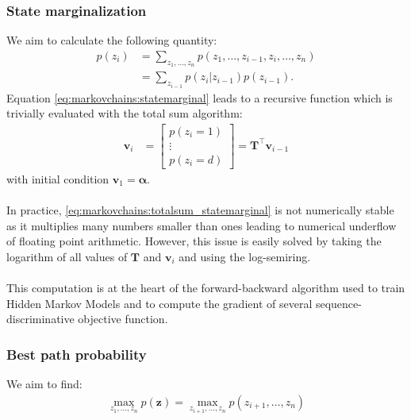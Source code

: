 \subsubsection{State marginalization}
We aim to calculate the following
quantity:
\begin{align}
    p(z_i) &= \sum_{z_1, \dots, z_{n}} p(z_1, \dots, z_{i-1}, z_i, \dots, z_n) \\
    &= \sum_{z_{i-1}} p(z_i | z_{i-1}) p(z_{i-1}).
    \label{eq:markovchains:statemarginal}
\end{align}
Equation \ref{eq:markovchains:statemarginal} leads to a recursive
function which is trivially evaluated with the total sum algorithm:
\begin{align}
    \mathbf{v}_i &= \begin{bmatrix}
        p(z_i = 1) \\
        \vdots \\
        p(z_i = d)
    \end{bmatrix} = \mathbf{T}^\top \mathbf{v}_{i-1}
    \label{eq:markovchains:totalsum_statemarginal}
\end{align}
with initial condition $\mathbf{v}_1 = \boldsymbol{\alpha}$.

\paragraph{} In practice, \eqref{eq:markovchains:totalsum_statemarginal} is not
numerically stable as it multiplies many numbers smaller than ones
leading to numerical underflow  of floating point arithmetic. However,
this issue is easily solved by taking the logarithm of all values of
$\mathbf{T}$  and $\mathbf{v}_i$ and using the log-semiring.

\paragraph{} This computation is at the heart of the forward-backward algorithm
used to train Hidden Markov Models and to compute the gradient of
several sequence-discriminative objective function.

\subsubsection{Best path probability}

We aim to find:
\begin{align}
    \max_{z_1, \dots, z_{n}} p(\mathbf{z}) = \max_{z_{i+1}, \dots, z_n} p(z_{i+1}, \dots, z_n)
\end{align}

